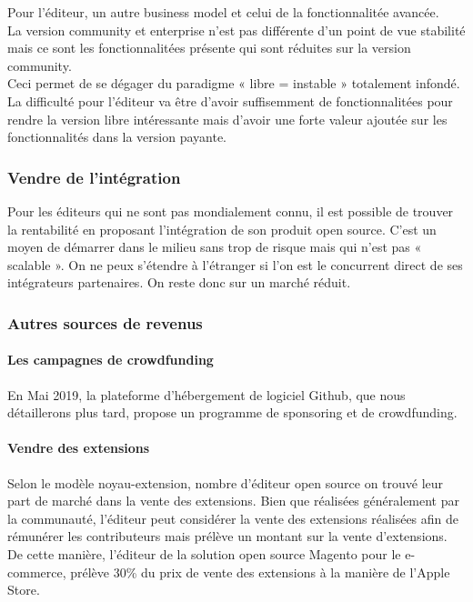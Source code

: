 			Pour l'éditeur, un autre business model et celui de la fonctionnalitée avancée.\\
			La version community et enterprise n'est pas différente d'un point de vue stabilité mais ce sont les fonctionnalitées présente qui sont réduites sur la version community.\\

			Ceci permet de se dégager du paradigme « libre = instable » totalement infondé.\\

			La difficulté pour l'éditeur va être d'avoir suffisemment de fonctionnalitées pour rendre la version libre intéressante mais d'avoir une forte valeur ajoutée sur les fonctionnalités dans la version payante.

			\subsubsection{Vendre de l'intégration}

			Pour les éditeurs qui ne sont pas mondialement connu, il est possible de trouver la rentabilité en proposant l'intégration de son produit open source. C'est un moyen de démarrer dans le milieu sans trop de risque mais qui n'est pas « \gls{scalable} ». On ne peux s'étendre à l'étranger si l'on est le concurrent direct de ses intégrateurs partenaires. On reste donc sur un marché réduit.

			\subsubsection{Autres sources de revenus}

			\paragraph{Les campagnes de crowdfunding\\}

				En Mai 2019, la plateforme d'hébergement de logiciel Github, que nous détaillerons plus tard, propose un programme de sponsoring et de crowdfunding.

			\paragraph{Vendre des extensions\\}

				Selon le modèle noyau-extension, nombre d'éditeur open source on trouvé leur part de marché dans la vente des extensions. Bien que réalisées généralement par la communauté, l'éditeur peut considérer la vente des extensions réalisées afin de rémunérer les contributeurs mais prélève un montant sur la vente d'extensions. De cette manière, l'éditeur de la solution open source Magento pour le e-commerce, prélève 30\% du prix de vente des extensions à la manière de l'Apple Store.
			
